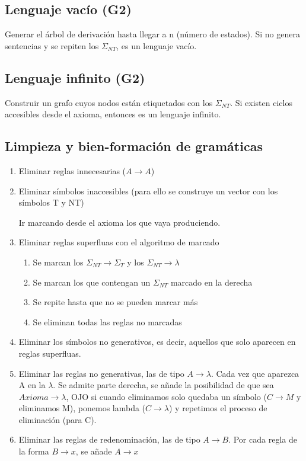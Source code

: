 \documentclass[12pt, twoside, openright]{report} %
\begin{document}
\subsection{Lenguaje vacío (G2)}
Generar el árbol de derivación hasta llegar a n (número de estados). Si no genera
sentencias y se repiten los $\Sigma_{NT}$, es un lenguaje vacío.

\subsection{Lenguaje infinito (G2)}
Construir un grafo cuyos nodos están etiquetados con los $\Sigma_{NT}$. Si existen ciclos
accesibles desde el axioma, entonces es un lenguaje infinito.

\subsection{Limpieza y bien-formación de gramáticas}
\begin{enumerate}
	\item Eliminar reglas innecesarias ($A \rightarrow A$)
	\item Eliminar símbolos inaccesibles (para ello se construye un vector con los símbolos T y NT)

	Ir marcando desde el axioma los que vaya produciendo.
	\item Eliminar reglas superfluas con el algoritmo de marcado
	\begin{enumerate}
		\item Se marcan los $\Sigma_{NT} \rightarrow \Sigma_{T}$ y los $\Sigma_{NT} \rightarrow \lambda$
		\item Se marcan los que contengan un $\Sigma_{NT}$ marcado en la derecha
		\item Se repite hasta que no se pueden marcar más
		\item Se eliminan todas las reglas no marcadas
	\end{enumerate}
	\item Eliminar los símbolos no generativos, es decir, aquellos que solo aparecen en reglas superfluas.
	\item Eliminar las reglas no generativas, las de tipo $A \rightarrow \lambda$. Cada vez que aparezca A en la $\lambda$. Se admite parte derecha, se añade la posibilidad de que sea $\textit{Axioma} \rightarrow \lambda$, OJO si cuando eliminamos solo quedaba un símbolo ($C \rightarrow M$ y eliminamos M), ponemos lambda ($C \rightarrow \lambda$) y repetimos el proceso de eliminación (para C).
	\item Eliminar las reglas de redenominación, las de tipo $A \rightarrow B$. Por cada regla de la forma $B \rightarrow x$, se añade $A \rightarrow x$
\end{enumerate}
\end{document}
